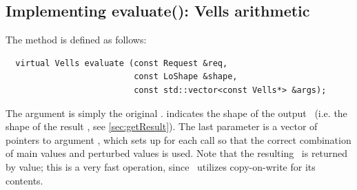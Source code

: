 \subsection{Implementing evaluate(): Vells arithmetic}
  \label{sec:vells}

  The  method is defined as follows:
  
  \begin{verbatim}  
  virtual Vells evaluate (const Request &req,
                          const LoShape &shape,
                          const std::vector<const Vells*> &args);
  \end{verbatim}
  
  The  argument is simply the original \Request.  indicates
  the shape of the output \Vells\ (i.e. the shape of the result \Cells, see
  \ref{sec:getResult}). The last parameter is a vector of pointers to argument
  \Vells, which  sets up for each call so that the correct
  combination of main values and perturbed values is used. Note that the
  resulting \Vells\ is returned by value; this is a very fast operation, since
  \Vells\ utilizes copy-on-write for its contents.

